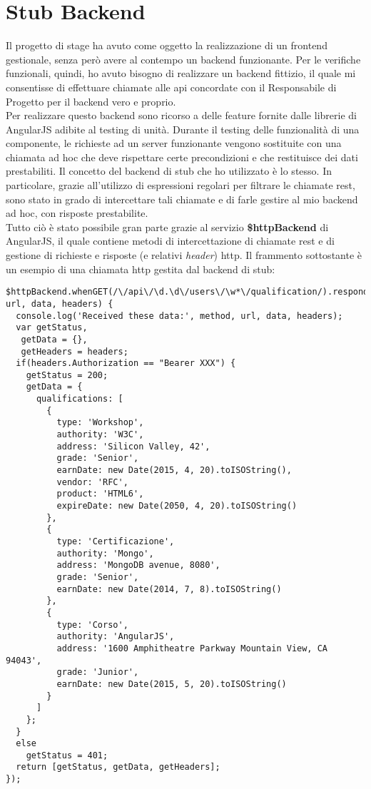 
\section{Stub Backend}
Il progetto di stage ha avuto come oggetto la realizzazione di un \gls{frontend} gestionale, senza però avere al contempo un \gls{backend} funzionante. Per le verifiche funzionali, quindi, ho avuto bisogno di realizzare un \gls{backend} fittizio, il quale mi consentisse di effettuare chiamate alle \gls{api} concordate con il Responsabile di Progetto per il backend vero e proprio.\\
Per realizzare questo \gls{backend} sono ricorso a delle feature fornite dalle librerie di AngularJS adibite al testing di unità. Durante il testing delle funzionalità di una componente, le richieste ad un server funzionante vengono sostituite con una chiamata ad hoc che deve rispettare certe precondizioni e che restituisce dei dati prestabiliti. Il concetto del \gls{backend} di \gls{stub} che ho utilizzato è lo stesso. In particolare, grazie all'utilizzo di espressioni regolari per filtrare le chiamate \gls{rest}, sono stato in grado di intercettare tali chiamate e di farle gestire al mio \gls{backend} ad hoc, con risposte prestabilite.\\
Tutto ciò è stato possibile gran parte grazie al servizio \textbf{\$httpBackend} di AngularJS, il quale contiene metodi di intercettazione di chiamate \gls{rest} e di gestione di richieste e risposte (e relativi \emph{header}) \gls{http}. Il frammento sottostante è un esempio di una chiamata \gls{http} gestita dal \gls{backend} di \gls{stub}:

\begin{verbatim}
$httpBackend.whenGET(/\/api\/\d.\d\/users\/\w*\/qualification/).respond(function(method, url, data, headers) {
  console.log('Received these data:', method, url, data, headers);
  var getStatus,
   getData = {},
   getHeaders = headers;
  if(headers.Authorization == "Bearer XXX") {
    getStatus = 200;
    getData = {
      qualifications: [
        {
          type: 'Workshop',
          authority: 'W3C',
          address: 'Silicon Valley, 42',
          grade: 'Senior',
          earnDate: new Date(2015, 4, 20).toISOString(),
          vendor: 'RFC',
          product: 'HTML6',
          expireDate: new Date(2050, 4, 20).toISOString()
        },
        {
          type: 'Certificazione',
          authority: 'Mongo',
          address: 'MongoDB avenue, 8080',
          grade: 'Senior',
          earnDate: new Date(2014, 7, 8).toISOString()
        },
        {
          type: 'Corso',
          authority: 'AngularJS',
          address: '1600 Amphitheatre Parkway Mountain View, CA 94043',
          grade: 'Junior',
          earnDate: new Date(2015, 5, 20).toISOString()
        }
      ]
    };
  }
  else
    getStatus = 401;
  return [getStatus, getData, getHeaders];
});
\end{verbatim} 

